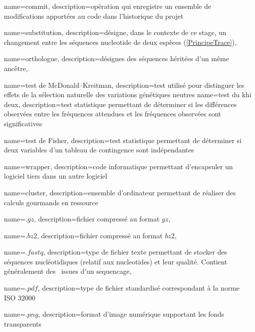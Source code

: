  {
    name=commit,
    description={opération qui enregistre un ensemble de modifications apportées au code dans l'historique du projet}
}


 {
    name=substitution,
    description={désigne, dans le contexte de ce stage, un changement entre les séquences \gls{nucleotide} de deux espèces (\cref{PrincipeTrace})},
}

 {
    name=orthologue,
    description={désignes des séquences héritées d'un même ancêtre},
}

 {
    name=test de McDonald–Kreitman,
    description={test utilisé pour distinguer les effets de la sélection naturelle des variations génétiques neutres}
}
 {
    name=test du khi deux,
    description={test statistique permettant de déterminer si les différences observées entre les fréquences attendues et les fréquences observées sont significatives}
}

 {
    name=test de Fisher,
    description={test statistique permettant de déterminer si deux variables d'un tableau de contingence sont indépendantes}
}

 {
    name=wrapper,
    description={code informatique permettant d'encapsuler un logiciel tiers dans un autre logiciel}
}

 {
    name=cluster,
    description={ensemble d'ordinateur permettant de réaliser des calculs gourmands en ressource}
}

 {
    name=$.gz$,
    description={fichier compressé au format $gz$},
}
\newcommand{\gz}{"\gls{gz}"}

 {
    name=$.bz2$,
    description={fichier compressé au format $bz2$},
}
\newcommand{\bz}{"\gls{bz}"}


 {
    name=$.fastq$,
    description={type de fichier texte permettant de stocker des séquences nucléotidiques (relatif aux \glspl{nucleotide}) et leur qualité. Contient généralement des \reads issues d'un \gls{sequencage}},
}
\newcommand{\fastq}{"\gls{fastq}"}


 {
    name=$.pdf$,
    description={type de fichier standardisé correspondant à la norme ISO 32000}
}
\newcommand{\pdf}{"\gls{pdf}"}

 {
    name=$.png$,
    description={format d'image numérique supportant les fonds transparents}
}
\newcommand{\png}{"\gls{png}"}

